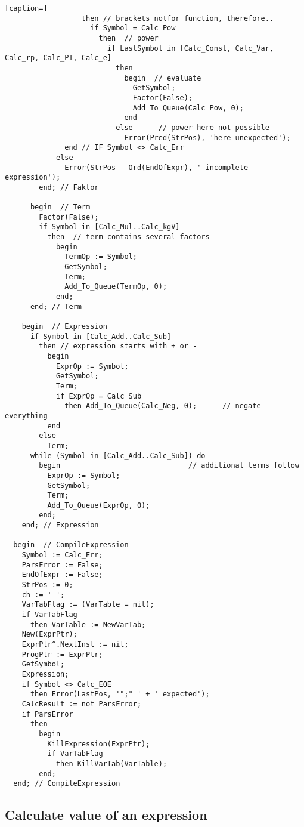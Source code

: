 \begin{refsection}
\begin{lstlisting}[caption=]
                  then // brackets notfor function, therefore..
                    if Symbol = Calc_Pow
                      then  // power
                        if LastSymbol in [Calc_Const, Calc_Var, Calc_rp, Calc_PI, Calc_e]
                          then
                            begin  // evaluate
                              GetSymbol;
                              Factor(False);
                              Add_To_Queue(Calc_Pow, 0);
                            end
                          else      // power here not possible
                            Error(Pred(StrPos), 'here unexpected');
              end // IF Symbol <> Calc_Err
            else
              Error(StrPos - Ord(EndOfExpr), ' incomplete expression');
        end; // Faktor

      begin  // Term
        Factor(False);
        if Symbol in [Calc_Mul..Calc_kgV]
          then  // term contains several factors
            begin
              TermOp := Symbol;
              GetSymbol;
              Term;
              Add_To_Queue(TermOp, 0);
            end;
      end; // Term

    begin  // Expression
      if Symbol in [Calc_Add..Calc_Sub]
        then // expression starts with + or -
          begin
            ExprOp := Symbol;
            GetSymbol;
            Term;
            if ExprOp = Calc_Sub
              then Add_To_Queue(Calc_Neg, 0);      // negate everything
          end
        else
          Term;
      while (Symbol in [Calc_Add..Calc_Sub]) do
        begin                              // additional terms follow
          ExprOp := Symbol;
          GetSymbol;
          Term;
          Add_To_Queue(ExprOp, 0);
        end;
    end; // Expression

  begin  // CompileExpression
    Symbol := Calc_Err;
    ParsError := False;
    EndOfExpr := False;
    StrPos := 0;
    ch := ' ';
    VarTabFlag := (VarTable = nil);
    if VarTabFlag
      then VarTable := NewVarTab;
    New(ExprPtr);
    ExprPtr^.NextInst := nil;
    ProgPtr := ExprPtr;
    GetSymbol;
    Expression;
    if Symbol <> Calc_EOE
      then Error(LastPos, '";" ' + ' expected');
    CalcResult := not ParsError;
    if ParsError
      then
        begin
          KillExpression(ExprPtr);
          if VarTabFlag
            then KillVarTab(VarTable);
        end;
  end; // CompileExpression
\end{lstlisting}

\subsection{Calculate value of an expression}


\end{refsection}
